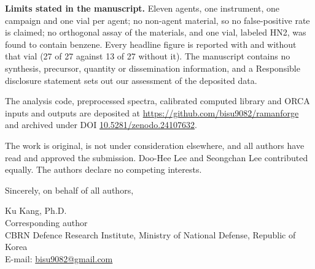 \documentclass[11pt,a4paper]{article}
\begin{document}
\textbf{Limits stated in the manuscript.} Eleven agents, one instrument, one campaign and
one vial per agent; no non-agent material, so no false-positive rate is claimed; no
orthogonal assay of the materials, and one vial, labeled HN2, was found to contain benzene.
Every headline figure is reported with and without that vial (27 of 27 against 13 of 27
without it). The manuscript contains no synthesis, precursor, quantity or dissemination
information, and a Responsible disclosure statement sets out our assessment of the
deposited data.

The analysis code, preprocessed spectra, calibrated computed library and ORCA inputs and
outputs are deposited at \url{https://github.com/bisu9082/ramanforge} and archived under
DOI \href{https://doi.org/10.5281/zenodo.24107632}{10.5281/zenodo.24107632}.

The work is original, is not under consideration elsewhere, and all authors have read and
approved the submission. Doo-Hee Lee and Seongchan Lee contributed equally. The authors
declare no competing interests.

Sincerely, on behalf of all authors,

\vspace{1.2em}
Ku Kang, Ph.D.\\
Corresponding author\\
CBRN Defence Research Institute, Ministry of National Defense, Republic of Korea\\
E-mail: \href{mailto:bisu9082@gmail.com}{bisu9082@gmail.com}
\end{document}
